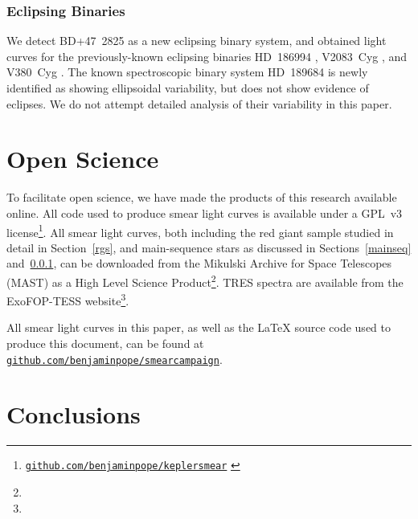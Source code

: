 \documentclass[modern]{aastex62}
\begin{document}
\subsubsection{Eclipsing Binaries}
\label{ebs}

We detect BD+47~2825 as a new eclipsing binary system, and obtained light curves for the previously-known eclipsing binaries HD~186994 \citep{2016AJ....151..101A}, V2083~Cyg \citep{2012MNRAS.421.1196Z}, and V380~Cyg \citep{2003A&A...399.1115C}. The known spectroscopic binary system HD~189684 \citep{2008MNRAS.389..869E} is newly identified as showing ellipsoidal variability, but does not show evidence of eclipses. We do not attempt detailed analysis of their variability in this paper.

\section{Open Science}
\label{open}

To facilitate open science, we have made the products of this research available online. All code used to produce smear light curves is available under a GPL~v3 license\footnote{ \href{https://github.com/benjaminpope/keplersmear}{\nolinkurl{github.com/benjaminpope/keplersmear}} \citep{keplersmear_zenodo}}. All smear light curves, both including the red giant sample studied in detail in Section~\ref{rgs}, and main-sequence stars as discussed in Sections~\ref{mainseq} and~\ref{ebs}, can be downloaded from the Mikulski Archive for Space Telescopes (MAST) as a High Level Science Product\footnote{}. TRES spectra are available from the ExoFOP-TESS website\footnote{}.

All smear light curves in this paper, as well as the \LaTeX{} source code used to produce this document, can be found
at \href{https://github.com/benjaminpope/smearcampaign}{\nolinkurl{github.com/benjaminpope/smearcampaign}}.


\section{Conclusions}
\label{conclusions}
\end{document}
